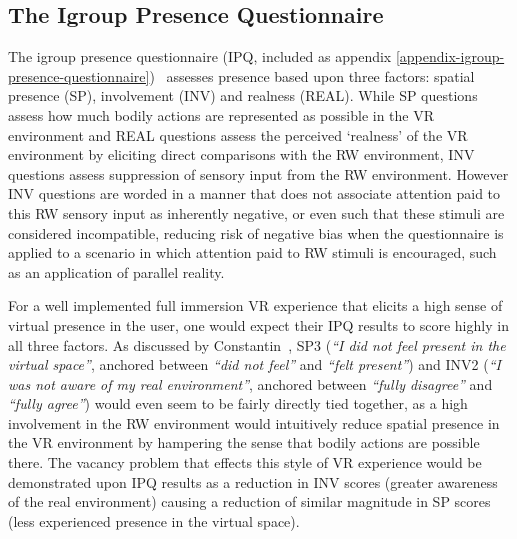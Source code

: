 \subsection{The Igroup Presence Questionnaire}
\label{igroup-presence-questionnaire-explanation}
The igroup presence questionnaire (IPQ, included as appendix \ref{appendix-igroup-presence-questionnaire})~\cite{Schubert2001} assesses presence based upon three factors: spatial presence (SP), involvement (INV) and realness (REAL). While SP questions assess how much bodily actions are represented as possible in the VR environment and REAL questions assess the perceived `realness' of the VR environment by eliciting direct comparisons with the RW environment, INV questions assess suppression of sensory input from the RW environment. However INV questions are worded in a manner that does not associate attention paid to this RW sensory input as inherently negative, or even such that these stimuli are considered incompatible, reducing risk of negative bias when the questionnaire is applied to a scenario in which attention paid to RW stimuli is encouraged, such as an application of parallel reality.

For a well implemented full immersion VR experience that elicits a high sense of virtual presence in the user, one would expect their IPQ results to score highly in all three factors. As discussed by Constantin~\cite{Constantin2003}, SP3 (\textit{``I did not feel present in the virtual space''}, anchored between \textit{``did not feel''} and \textit{``felt present''}) and INV2 (\textit{``I was not aware of my real environment''}, anchored between \textit{``fully disagree''} and \textit{``fully agree''}) would even seem to be fairly directly tied together, as a high involvement in the RW environment would intuitively reduce spatial presence in the VR environment by hampering the sense that bodily actions are possible there. The vacancy problem that effects this style of VR experience would be demonstrated upon IPQ results as a reduction in INV scores (greater awareness of the real environment) causing a reduction of similar magnitude in SP scores (less experienced presence in the virtual space).

